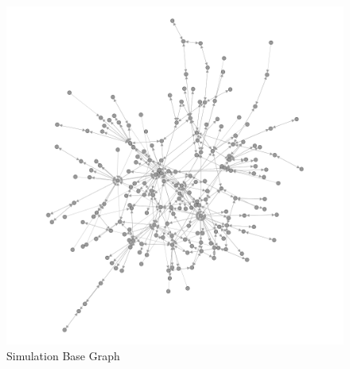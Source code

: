 \documentclass[]{report}
\begin{document}

\begin{figure}
\label{img:simbase}
\begin{center}
\includegraphics[scale=0.4]{simbase.png}
\end{center}
\caption{Simulation Base Graph}
\end{figure}

\end{document}
